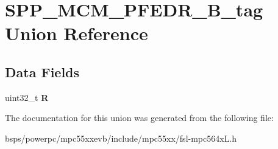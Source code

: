 \hypertarget{unionSPP__MCM__PFEDR__32B__tag}{}\section{S\+P\+P\+\_\+\+M\+C\+M\+\_\+\+P\+F\+E\+D\+R\+\_\+B\+\_\+tag Union Reference}
\label{unionSPP__MCM__PFEDR__32B__tag}
\subsection*{Data Fields}
\begin{DoxyCompactItemize}
\item 
\mbox{\label{unionSPP__MCM__PFEDR__32B__tag_ae128489a050bec114e7cf4c82f48044c}} 
uint32\+\_\+t {\bfseries R}
\end{DoxyCompactItemize}


The documentation for this union was generated from the following file\+:\begin{DoxyCompactItemize}
\item 
bsps/powerpc/mpc55xxevb/include/mpc55xx/fsl-\/mpc564x\+L.\+h\end{DoxyCompactItemize}
